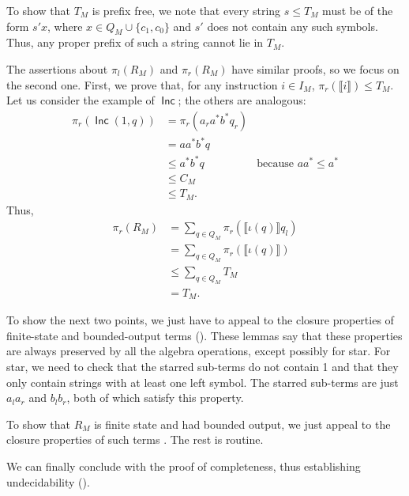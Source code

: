 \documentclass[a4paper,UKenglish,cleveref, autoref, thm-restate]{lipics-v2021}
\DeclareMathOperator{\Inc}{\mathsf{Inc}}
\begin{document}
\begin{proofEnd} %
\iffull%
%
  To show that $T_M$ is prefix free, we note that every string $s  \leq  T_M$ must be
  of the form $s'x$, where $x  \in  Q_M  \cup  \{c_1,c_0\}$ and $s'$ does not contain any
  such symbols.  Thus, any proper prefix of such a string cannot lie in $T_M$.

  The assertions about $ \pi _l(R_M)$ and $ \pi _r(R_M)$ have similar proofs, so we
  focus on the second one.  First, we prove that, for any instruction $i  \in  I_M$,
  $ \pi _r( \llbracket i \rrbracket )  \leq  T_M$.  Let us consider the example of $\Inc$; the others are
  analogous:
  \begin{align*}
     \pi _r(\Inc(1,q))
    & =  \pi _r(a_ra^*b^*q_r) \\
    & = aa^*b^*q \\
    &  \leq  a^*b^*q
    & \text{because $aa^*  \leq  a^*$} \\
    &  \leq  C_M \\
    &  \leq  T_M.
  \end{align*}
  Thus,
  \begin{align*}
     \pi _r(R_M)
    & =  \sum _{q  \in  Q_M} \pi _r( \llbracket  \iota (q) \rrbracket q_l) \\
    & =  \sum _{q  \in  Q_M} \pi _r( \llbracket  \iota (q) \rrbracket ) \\
    &  \leq   \sum _{q  \in  Q_M}T_M \\
    & = T_M.
  \end{align*}

  To show the next two points, we just have to appeal to the closure properties
  of finite-state and bounded-output terms
  ().  These lemmas
  say that these properties are always preserved by all the algebra operations,
  except possibly for star.  For star, we need to check that the starred
  sub-terms do not contain 1 and that they only contain strings with at least
  one left symbol.  The starred sub-terms are just $a_la_r$ and $b_lb_r$, both
  of which satisfy this property.

%
\else%
  To show that $R_M$ is finite state and had bounded output, we just appeal to
  the closure properties of such terms
  .  The rest is
  routine.
%
\fi
\end{proofEnd}

We can finally conclude with the proof of completeness, thus establishing
undecidability ().
\end{document}
